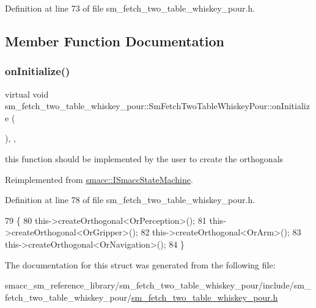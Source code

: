 Definition at line 73 of file sm\+\_\+fetch\+\_\+two\+\_\+table\+\_\+whiskey\+\_\+pour.\+h.



\subsection{Member Function Documentation}
\mbox{\label{structsm__fetch__two__table__whiskey__pour_1_1SmFetchTwoTableWhiskeyPour_a7bdeb9c749961c650b0e06e0ff646f5a}} 
\subsubsection{\texorpdfstring{on\+Initialize()}{onInitialize()}}
{\footnotesize\ttfamily virtual void sm\+\_\+fetch\+\_\+two\+\_\+table\+\_\+whiskey\+\_\+pour\+::\+Sm\+Fetch\+Two\+Table\+Whiskey\+Pour\+::on\+Initialize (\begin{DoxyParamCaption}{ }\end{DoxyParamCaption})\hspace{0.3cm}{\ttfamily [inline]}, {\ttfamily [override]}, {\ttfamily [virtual]}}



this function should be implemented by the user to create the orthogonals 



Reimplemented from \hyperlink{classsmacc_1_1ISmaccStateMachine_ac2982c6c8283663e5e1e8a7c82f511ec}{smacc\+::\+I\+Smacc\+State\+Machine}.



Definition at line 78 of file sm\+\_\+fetch\+\_\+two\+\_\+table\+\_\+whiskey\+\_\+pour.\+h.


\begin{DoxyCode}
79         \{
80             this->createOrthogonal<OrPerception>();
81             this->createOrthogonal<OrGripper>();
82             this->createOrthogonal<OrArm>();
83             this->createOrthogonal<OrNavigation>();
84         \}
\end{DoxyCode}


The documentation for this struct was generated from the following file\+:\begin{DoxyCompactItemize}
\item 
smacc\+\_\+sm\+\_\+reference\+\_\+library/sm\+\_\+fetch\+\_\+two\+\_\+table\+\_\+whiskey\+\_\+pour/include/sm\+\_\+fetch\+\_\+two\+\_\+table\+\_\+whiskey\+\_\+pour/\hyperlink{sm__fetch__two__table__whiskey__pour_8h}{sm\+\_\+fetch\+\_\+two\+\_\+table\+\_\+whiskey\+\_\+pour.\+h}\end{DoxyCompactItemize}
